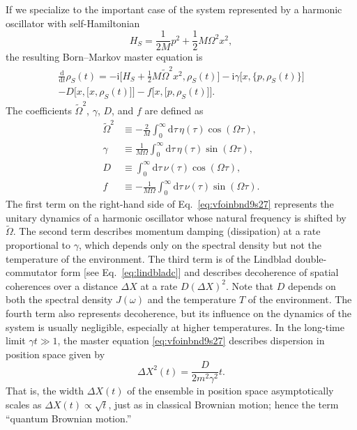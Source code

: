 \documentclass[aps,pra,reprint,amsmath,amssymb,showpacs,nofootinbib,floatfix,onecolumn,12pt]{revtex4-1}
\newcommand{\D}{\text{d}}
\newcommand{\I}{\text{i}}
\begin{document}
If we specialize to the important case of the system represented by a harmonic oscillator with 
self-Hamiltonian
%
\begin{equation}
  \label{eq:sfsfsdfy7jaa11}
  H_S =  \frac{1}{2M}p^2 +
  \frac{1}{2}M\Omega^2x^2,
\end{equation}
%
the resulting Born--Markov master equation is
%
\begin{multline}
\label{eq:vfoinbnd9s27}
  \frac{\D}{\D t} \rho_S(t) 
  = -\I \bigl[ H_S + \frac{1}{2}M
    \widetilde{\Omega}^2 x^2, \rho_S(t) \bigr]
  - \I \gamma \bigl[ x, \bigr\{ p,
      \rho_S(t) \bigr\} \bigr] 
\\ - D \bigl[ x, \bigl[ x, \rho_S(t) \bigr]
\bigr] 
- f \bigl[ x, \bigl[ p, \rho_S(t) \bigr]
\bigr].
\end{multline}
%
The coefficients $\widetilde{\Omega}^2$, $\gamma$, $D$, and $f$ are defined as
%
\begin{subequations}\label{eq:jcsfr09355378}
\begin{align}
  \widetilde{\Omega}^2 &\equiv - \frac{2}{M} \int_0^\infty \D \tau \,
  \eta(\tau) \cos\left( \Omega \tau \right), \label{eq:caytcs1} \\
  \gamma &\equiv \frac{1}{M\Omega} \int_0^\infty \D \tau \,
  \eta(\tau) \sin\left( \Omega \tau \right), \label{eq:caytcs2} \\
  D &\equiv  \int_0^\infty \D \tau \,
  \nu(\tau) \cos\left( \Omega \tau \right), \label{eq:caytcs3}  \\
  f &\equiv - \frac{1}{M\Omega} \int_0^\infty \D \tau \,
  \nu(\tau) \sin\left( \Omega \tau \right). \label{eq:caytcs4} 
\end{align}
\end{subequations}
% 
The first term on the right-hand side of Eq.~\eqref{eq:vfoinbnd9s27} represents the unitary dynamics of a harmonic oscillator whose natural frequency is shifted by $\widetilde{\Omega}$. The second term describes momentum damping (dissipation) at a rate proportional to $\gamma$, which depends only on the spectral density but not the temperature of the environment. The third term is of the Lindblad double-commutator form [see Eq.~\eqref{eq:lindbladc}] and describes decoherence of spatial coherences over a distance $\Delta X$ at a rate $D(\Delta X)^2$. Note that $D$ depends on both the spectral density $J(\omega)$ and the temperature $T$ of the environment. The fourth term also represents decoherence, but its influence on the dynamics of the system is usually negligible, especially at higher temperatures. In the long-time limit $\gamma t \gg 1$, the master equation \eqref{eq:vfoinbnd9s27} describes dispersion in position space given by
%
\begin{equation}
  \Delta X^2(t) = \frac{D}{2m^2 \gamma^2} t.
\end{equation}
%
That is, the width $\Delta X(t)$ of the ensemble in position space asymptotically scales as $\Delta X(t) \propto \sqrt{t}$, just as in classical Brownian motion; hence the term ``quantum Brownian motion.'' 
\end{document}
